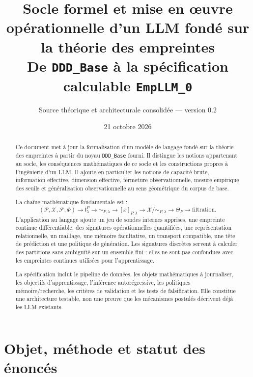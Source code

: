 \documentclass[11pt,a4paper]{article}
\title{\textbf{Socle formel et mise en œuvre opérationnelle d'un LLM fondé sur la théorie des empreintes}\\[0.35em]
\large De \texttt{DDD\_Base} à la spécification calculable \texttt{EmpLLM\_0}}
\author{Source théorique et architecturale consolidée — version 0.2}
\date{21 octobre 2026}
\theoremstyle{remark}
\newcommand{\X}{\mathcal X}
\newcommand{\Pctx}{\mathcal P}
\newcommand{\F}{\mathcal F}
\newcommand{\Emp}{\mathsf I}
\begin{document}
\maketitle

\begin{abstract}
Ce document met à jour la formalisation d'un modèle de langage fondé sur la théorie des empreintes à partir du noyau \texttt{DDD\_Base} fourni. Il distingue les notions appartenant au socle, les conséquences mathématiques de ce socle et les constructions propres à l'ingénierie d'un LLM. Il ajoute en particulier les notions de capacité brute, information effective, dimension effective, fermeture observationnelle, mesure empirique des seuils et généralisation observationnelle au sens géométrique du corpus de base.

La chaîne mathématique fondamentale est :
\[
(\Pctx,\X,\F,\Phi)\to \Emp_{\lambda}^{P}\to \sim_{P,\lambda}\to [x]_{P,\lambda}\to \X/{\sim_{P,\lambda}}\to \Theta_P\to \text{filtration}.
\]
L'application au langage ajoute un jeu de sondes internes apprises, une empreinte continue différentiable, des signatures opérationnelles quantifiées, une représentation relationnelle, un maillage, une mémoire facultative, un transport compatible, une tête de prédiction et une politique de génération. Les signatures discrètes servent à calculer des partitions sans ambiguïté sur un ensemble fini ; elles ne sont pas confondues avec les empreintes continues utilisées pour l'apprentissage.

La spécification inclut le pipeline de données, les objets mathématiques à journaliser, les objectifs d'apprentissage, l'inférence autorégressive, les politiques mémoire/recherche, les critères de validation et les tests de falsification. Elle constitue une architecture testable, non une preuve que les mécanismes postulés décrivent déjà les LLM existants.
\end{abstract}

\clearpage
\tableofcontents
\clearpage

\section{Objet, méthode et statut des énoncés}
\end{document}
